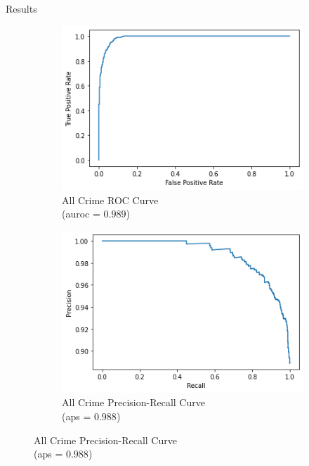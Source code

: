 \documentclass[10pt]{beamer}
\begin{document}
\begin{frame}{Results}
\begin{figure}
\centering
\begin{subfigure}{.5\textwidth}
  \centering
  \includegraphics[width=0.7\linewidth]{ROC.png}
  \caption{All Crime ROC Curve \\
  (auroc = $0.989$)}
  \label{fig:sub1}
\end{subfigure}%
\begin{subfigure}{.5\textwidth}
  \centering
  \includegraphics[width=0.7\linewidth]{PRC.png}
  \caption{All Crime Precision-Recall Curve \\
  (aps = $0.988$)}
  \label{fig:sub2}
\end{subfigure}


\end{figure}
\end{frame}
\end{document}
